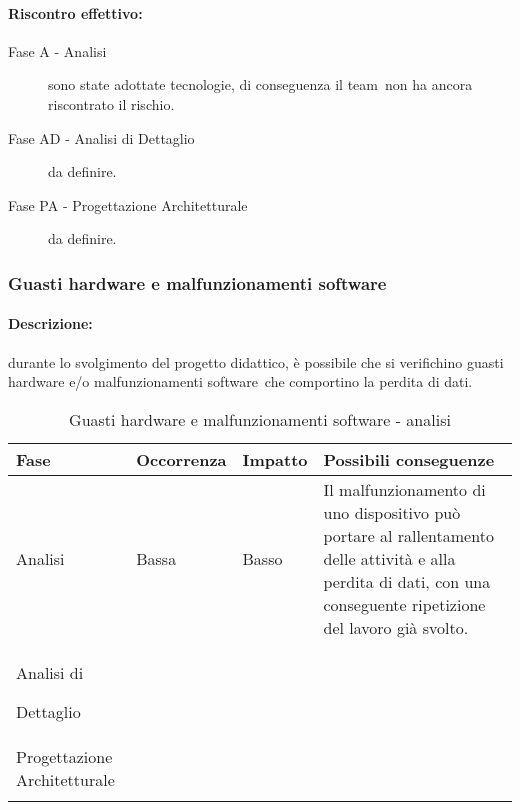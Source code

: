 \documentclass[../PianoProgetto.tex]{subfiles}
\begin{document}
	\paragraph*{Riscontro effettivo:} 
		\begin{description}
			\item[Fase A - Analisi] sono state adottate tecnologie, di conseguenza il team\g\ non ha ancora riscontrato il rischio.
			\item[Fase AD - Analisi di Dettaglio] da definire.
			\item[Fase PA - Progettazione Architetturale] da definire.
		\end{description}


	\subsubsection{Guasti hardware e malfunzionamenti software}
	
	\paragraph*{Descrizione:} durante lo svolgimento del progetto didattico, è possibile che si verifichino guasti hardware e/o malfunzionamenti software\g\ che comportino la perdita di dati.
	
	
	\begin{table}[h]
		\centering
		\begin{tabularx}{\textwidth}{F O O P}
			\toprule
			\textbf{Fase} & \textbf{Occorrenza} & \textbf{Impatto} & \textbf{Possibili conseguenze}\\
			\midrule
			Analisi & Bassa & Basso & Il malfunzionamento di uno dispositivo può portare al rallentamento delle attività e alla perdita di dati, con una conseguente ripetizione del lavoro già svolto. \\
			\midrule
			Analisi di \par Dettaglio & & & \\
			\midrule
			Progettazione Architetturale & & & \\
			\bottomrule
		\end{tabularx}
		\caption{Guasti hardware e malfunzionamenti software - analisi}
		\label{tab:Guasti hardware e malfunzionamenti software - analisi}	
	\end{table} 
		
\end{document}
